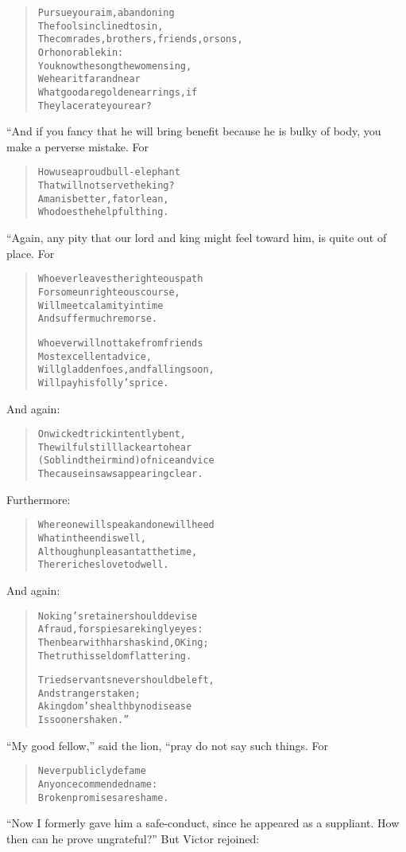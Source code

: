 \documentclass[article, twoside, 14pt]{memoir}
\renewenvironment{verbatim}{%
\begin{quote}%
\vskip -10pt%
\begin{alltt}\normalfont\large}{\end{alltt}%
\end{quote}%
\vskip -10pt
} %
\begin{document}
\begin{verbatim}
Pursue your aim, abandoning
    The fools inclined to sin,
The comrades, brothers, friends, or sons,
    Or honorable kin:
You know the song the women sing,
    We hear it far and near{\textemdash}
What good are golden earrings, if
    They lacerate your ear?
\end{verbatim}
“And if you fancy that he will bring benefit because he is bulky of
body, you make a perverse mistake. For

\begin{verbatim}
How use a proud bull-elephant
    That will not serve the king?
A man is better, fat or lean,
    Who does the helpful thing.
\end{verbatim}
“Again, any pity that our lord and king might feel toward him, is
quite out of place. For

\begin{verbatim}
Whoever leaves the righteous path
    For some unrighteous course,
Will meet calamity in time
    And suffer much remorse.

Whoever will not take from friends
    Most excellent advice,
Will gladden foes, and falling soon,
    Will pay his folly's price.
\end{verbatim}
And again:

\begin{verbatim}
On wicked trick intently bent,
    The wilful still lack ear to hear
(So blind their mind) of nice and vice
    The cause in saws appearing clear.
\end{verbatim}
Furthermore:

\begin{verbatim}
Where one will speak and one will heed
    What in the end is well,
Although unpleasant at the time,
    There riches love to dwell.
\end{verbatim}
And again:

\begin{verbatim}
No king's retainer should devise
A fraud, for spies are kingly eyes:
Then bear with harsh as kind, O King;
The truth is seldom flattering.

Tried servants never should be left,
    And strangers taken;
A kingdom's health by no disease
    Is sooner shaken.”
\end{verbatim}
``My good fellow,'' said the lion, “pray do not say such things.
For

\begin{verbatim}
Never publicly defame
Any once commended name:
Broken promises are shame.
\end{verbatim}
``Now I formerly gave him a safe-conduct, since he appeared as a suppliant. How then can he prove ungrateful?''
But Victor rejoined:
\end{document}
